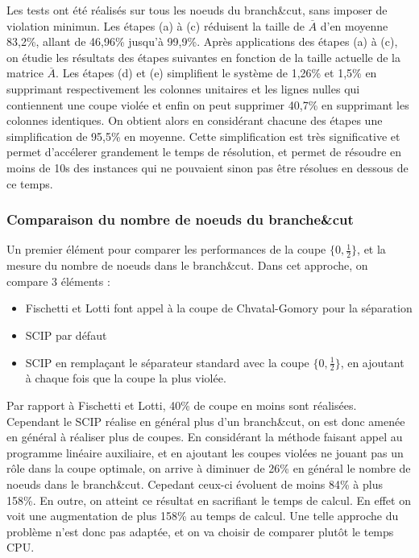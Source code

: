 \documentclass[12pt]{report}
\begin{document}
Les tests ont été réalisés sur tous les noeuds du branch\&cut, sans imposer de violation minimun.
Les étapes (a) à (c) réduisent la taille de $\overset{\_}{A}$ d'en moyenne 83,2\%, allant de 46,96\% jusqu'à 99,9\%.
Après applications des étapes (a) à (c), on étudie les résultats des étapes suivantes en fonction de la taille actuelle de la matrice $\overset{\_}{A}$. Les étapes (d) et (e) simplifient le système de 1,26\% et 1,5\% en supprimant respectivement les colonnes unitaires et les lignes nulles qui contiennent une coupe violée et enfin on peut supprimer 40,7\% en supprimant les colonnes identiques.
On obtient alors en considérant chacune des étapes une simplification de 95,5\% en moyenne.
Cette simplification est très significative et permet d'accélerer grandement le temps de résolution, et permet de résoudre en moins de 10s des instances qui ne pouvaient sinon pas être résolues en dessous de ce temps.

\subsubsection{Comparaison du nombre de noeuds du branche\&cut}
Un premier élément pour comparer les performances de la coupe $\{0,\frac{1}{2}\}$, et la mesure du nombre de noeuds dans le branch\&cut. Dans cet approche, on compare 3 éléments :
\begin{itemize}
    \item Fischetti et Lotti font appel à la coupe de Chvatal-Gomory pour la séparation
    \item SCIP par défaut
    \item SCIP en remplaçant le séparateur standard avec la coupe $\{0,\frac{1}{2}\}$, en ajoutant à chaque fois que la coupe la plus violée.
\end{itemize}
Par rapport à Fischetti et Lotti, 40\% de coupe en moins sont réalisées. Cependant le SCIP réalise en général plus d'un branch\&cut, on est donc amenée en général à réaliser plus de coupes.
En considérant la méthode faisant appel au programme linéaire auxiliaire, et en ajoutant les coupes violées ne jouant pas un rôle dans la coupe optimale, on arrive à diminuer de 26\% en général le nombre de noeuds dans le branch\&cut. Cepedant ceux-ci évoluent de moins 84\% à plus 158\%. En outre, on atteint ce résultat en sacrifiant le temps de calcul. En effet on voit une augmentation de plus 158\% au temps de calcul.
Une telle approche du problème n'est donc pas adaptée, et on va choisir de comparer plutôt le temps CPU.
\end{document}
